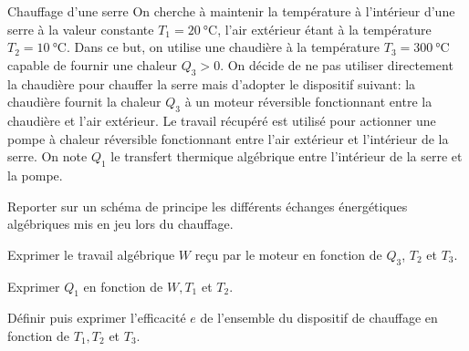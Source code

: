 \begin{exo}[PC][2]{Chauffage d'une serre}
On cherche à maintenir la température à l'intérieur d'une serre à la valeur constante $T_1=\SI{20}{\celsius}$, l'air extérieur étant à la température $T_2=\SI{10}{\celsius}$. Dans ce but, on utilise une chaudière à la température $T_3=\SI{300}{\celsius}$ capable de fournir une chaleur $Q_3>0$. On décide de ne pas utiliser directement la chaudière pour chauffer la serre mais d'adopter le dispositif suivant: la chaudière fournit la chaleur $Q_3$ à un moteur réversible fonctionnant entre la chaudière et l'air extérieur. Le travail récupéré est utilisé pour actionner une pompe à chaleur réversible fonctionnant entre l'air extérieur et l'intérieur de la serre. On note $Q_1$ le transfert thermique algébrique entre l'intérieur de la serre et la pompe.
\begin{quest}
\item Reporter sur un schéma de principe les différents échanges énergétiques algébriques mis en jeu lors du chauffage.
\item Exprimer le travail algébrique $W$ reçu par le moteur en fonction de $Q_3$, $T_2$ et $T_3$.
\item Exprimer $Q_1$ en fonction de $W,T_1$ et $T_2$.
\item Définir puis exprimer l'efficacité $e$ de l'ensemble du dispositif de chauffage en fonction de $T_1,T_2$ et $T_3$.
\end{quest}
\end{exo}



